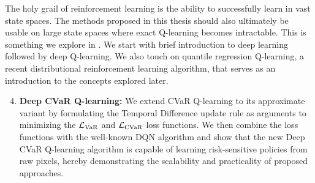 The holy grail of reinforcement learning is the ability to successfully learn in vast state spaces. The methods proposed in this thesis should also ultimately be usable on large state spaces where exact Q-learning becomes intractable. This is something we explore in .
We start with brief introduction to deep learning followed by deep Q-learning. We also touch on quantile regression Q-learning, a recent distributional reinforcement learning algorithm, that serves as an introduction to the concepts explored later.

\begin{enumerate}
\setcounter{enumi}{3}
\item \textbf{Deep CVaR Q-learning:}  We extend CVaR Q-learning to its approximate variant by formulating the Temporal Difference update rule as arguments to minimizing the $\mathcal{L}_{\text{VaR}}$ and $\mathcal{L}_{\text{CVaR}}$ loss functions. We then combine the loss functions with the well-known DQN \citep{mnih2015human} algorithm and show that the new Deep CVaR Q-learning algorithm is capable of learning risk-sensitive policies from raw pixels, hereby demonstrating the scalability and practicality of proposed approaches.
\end{enumerate}


